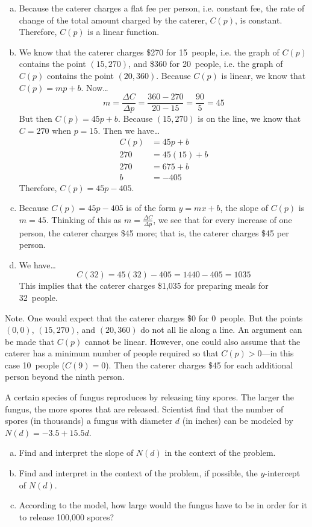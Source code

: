 \documentclass[12pt,letterpaper]{exam}
\begin{document}
\begin{questions}
{\itshape
\begin{enumerate}[(a)]
\item Because the caterer charges a flat fee per person, i.e. constant fee, the rate of change of the total amount charged by the caterer, $C(p)$, is constant. Therefore, $C(p)$ is a linear function. \pspace

\item We know that the caterer charges \$270 for 15~people, i.e. the graph of $C(p)$ contains the point $(15, 270)$, and \$360 for 20~people, i.e. the graph of $C(p)$ contains the point $(20, 360)$. Because $C(p)$ is linear, we know that $C(p)= mp + b$. Now\dots
	\[
	m= \dfrac{\Delta C}{\Delta p}= \dfrac{360 - 270}{20 - 15}= \dfrac{90}{5}= 45
	\]
But then $C(p)= 45p + b$. Because $(15, 270)$ is on the line, we know that $C= 270$ when $p= 15$. Then we have\dots
	\[
	\begin{aligned}
	C(p)&= 45p + b \\[0.3cm]
	270&= 45(15) + b \\[0.3cm]
	270&= 675 + b \\[0.3cm]
	b&= -405
	\end{aligned}
	\]
Therefore, $C(p)= 45p - 405$. \pspace

\item Because $C(p)= 45p - 405$ is of the form $y= mx + b$, the slope of $C(p)$ is $m= 45$. Thinking of this as $m= \frac{\Delta C}{\Delta p}$, we see that for every increase of one person, the caterer charges \$45 more; that is, the caterer charges \$45 per person. \pspace

\item We have\dots
	\[
	C(32)= 45(32) - 405= 1440 - 405= 1035
	\]
This implies that the caterer charges \$1,035 for preparing meals for 32~people. 
\end{enumerate}

\vfill Note. One would expect that the caterer charges \$0 for 0~people. But the points $(0, 0)$, $(15, 270)$, and $(20, 360)$ do not all lie along a line. An argument can be made that $C(p)$ cannot be linear. However, one could also assume that the caterer has a minimum number of people required so that $C(p) > 0$---in this case 10~people ($C(9)= 0$). Then the caterer charges \$45 for each additional person beyond the ninth person. 
}



\newpage
\question[10] A certain species of fungus reproduces by releasing tiny spores. The larger the fungus, the more spores that are released. Scientist find that the number of spores (in thousands) a fungus with diameter $d$ (in inches) can be modeled by $N(d)= -3.5 + 15.5d$.
	\begin{enumerate}[(a)]
	\item Find and interpret the slope of $N(d)$ in the context of the problem.
	\item Find and interpret in the context of the problem, if possible, the $y$-intercept of $N(d)$.
	\item According to the model, how large would the fungus have to be in order for it to release 100,000 spores?
	\end{enumerate} \pspace


\end{questions}
\end{document}
